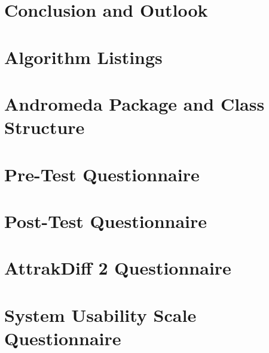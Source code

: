 \documentclass[a4paper,11pt,twoside]{memoir}
\begin{document}
\chapter{Conclusion and Outlook}
\label{ch:conclusion}




\newpage
\begin{appendices}
  \chapter{Algorithm Listings}
  \label{app:algorithm}
  
  \chapter{Andromeda Package and Class Structure}
  \label{app:packages}
  
  \chapter{Pre-Test Questionnaire}
  \label{app:pretest}
  
  \chapter{Post-Test Questionnaire}
  \label{app:posttest}
  
  \chapter{AttrakDiff 2 Questionnaire}
  \label{app:attrakdiff}
  
  \chapter{System Usability Scale Questionnaire}
  \label{app:sus}
  
\end{appendices}



\end{document}
